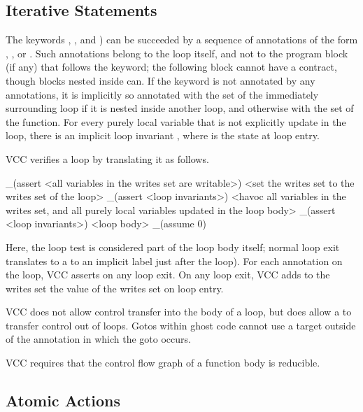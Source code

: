 \documentclass[preprint,nocopyrightspace]{sigplanconf}
\begin{document}
{{{{\begin{VCC}
\subsection{Iterative Statements}
The keywords , , and ) 
can be succeeded by a sequence of annotations of the form 
, , or 
. Such annotations belong to the loop itself, and
not to the program block (if any) that follows the keyword; the
following block cannot have a contract, though blocks nested inside
can. If the keyword is not annotated by any  annotations,
it is implicitly so annotated with the  set of the
immediately surrounding loop if it is nested inside another loop, and
otherwise with the  set of the function. For every
purely local variable  that is not explicitly update in the
loop, there is an implicit loop invariant ,
where  is the state at loop entry.

VCC verifies a loop by translating it as follows. 

\begin{VCC}
_(assert <all variables in the writes set are writable>)
<set the writes set to the writes set of the loop>
_(assert <loop invariants>)
<havoc all variables in the writes set, and all purely local variables
 updated in the loop body>
_(assert <loop invariants>)
<loop body>
_(assume 0)

\end{VCC}

Here, the loop test is considered part of the loop body itself; normal
loop exit translates to a  to an implicit label just after the
loop). For each annotation  on the loop, VCC asserts 
 on any loop exit. On any loop exit, VCC adds to the writes set
the value of the writes set on loop entry.

VCC does not allow control transfer into the body of a loop, but does
allow a  to transfer control out of loops.
Gotos within ghost code cannot use a target outside of
the  annotation in which the goto occurs.

VCC requires that the control flow graph of a function body is
reducible. 

\subsection{Atomic Actions}


\end{VCC}}}}}
\end{document}
